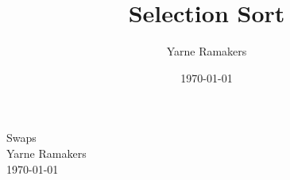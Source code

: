 \documentclass[a4paper]{article}
\title{Selection Sort}
\author{Yarne Ramakers}
\date{\today}
\begin{document}
\begin{center}
  Swaps \\
  Yarne Ramakers \\
  \today \\
\end{center}
\end{document}
